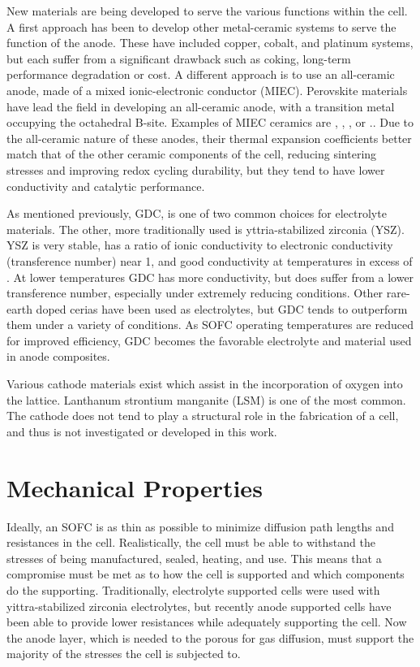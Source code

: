 New materials are being developed to serve the various functions within the cell.
A first approach has been to develop other metal-ceramic systems to serve the function of the anode.
These have included copper, cobalt, and platinum systems, but each suffer from a significant drawback such as coking, long-term performance degradation or cost.
A different approach is to use an all-ceramic anode, made of a mixed ionic-electronic conductor (MIEC).
Perovskite materials have lead the field in developing an all-ceramic anode, with a transition metal occupying the octahedral B-site.
Examples of MIEC ceramics are , , , or .\cite{Goodenough2007,Zha2005,Primdahl2001,Hussain2013,MohammedHussain2012,Hussain2016,Huang2006}.
Due to the all-ceramic nature of these anodes, their thermal expansion coefficients better match that of the other ceramic components of the cell, reducing sintering stresses and improving redox cycling durability, but they tend to have lower conductivity and catalytic performance.

As mentioned previously, GDC, is one of two common choices for electrolyte materials.
The other, more traditionally used is yttria-stabilized zirconia (YSZ).
YSZ is very stable, has a ratio of ionic conductivity to electronic conductivity (transference number) near 1, and good conductivity at temperatures in excess of .
At lower temperatures GDC has more conductivity, but does suffer from a lower transference number, especially under extremely reducing conditions.
Other rare-earth doped cerias have been used as electrolytes, but GDC tends to outperform them under a variety of conditions.
As SOFC operating temperatures are reduced for improved efficiency, GDC becomes the favorable electrolyte and material used in anode composites.

Various cathode materials exist which assist in the incorporation of oxygen into the lattice.
Lanthanum strontium manganite (LSM) is one of the most common.
The cathode does not tend to play a structural role in the fabrication of a cell, and thus is not investigated or developed in this work.

\section{Mechanical Properties}

Ideally, an SOFC is as thin as possible to minimize diffusion path lengths and resistances in the cell.\cite{Chan2001}
Realistically, the cell must be able to withstand the stresses of being manufactured, sealed, heating, and use.
This means that a compromise must be met as to how the cell is supported and which components do the supporting.
Traditionally, electrolyte supported cells were used with yittra-stabilized zirconia electrolytes, but recently anode supported cells have been able to provide lower resistances while adequately supporting the cell.\cite{Fleischhauer2014a,Laurencin2008}
Now the anode layer, which is needed to the porous for gas diffusion, must support the majority of the stresses the cell is subjected to.

